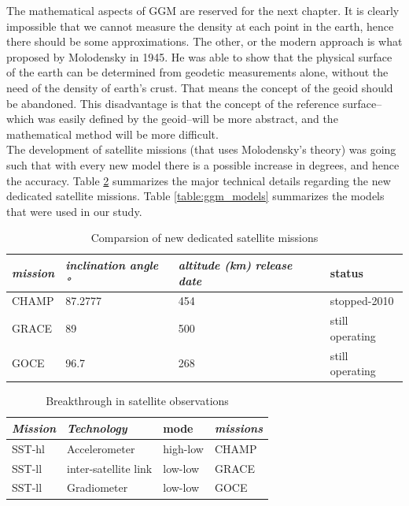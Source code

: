  The mathematical aspects of GGM are reserved for the next chapter. It is clearly impossible that we cannot measure the density at each point in the earth, hence there should be some approximations. The other, or the modern approach is what proposed by Molodensky in 1945. He was able to show that the physical surface of the earth can be determined from geodetic measurements alone, without the need of the density of earth's crust. That means the concept of the geoid should be abandoned. This disadvantage is that the concept of the reference surface--which was easily defined by the geoid--will be more abstract, and the mathematical method will be more difficult.
 \\
 The development of satellite missions (that uses Molodensky's theory) was going such that with every new model there is a possible increase in degrees, and hence the accuracy. Table \ref{table:satellite_evolution} summarizes the major technical details regarding the new dedicated satellite missions. Table \ref{table:ggm_models} summarizes the models that were used in our study. 
 
 \begin{table}[]
 	\centering
 	\caption{Comparsion of new dedicated satellite missions}
 	\label{table:satellite_missions}
 	\begin{tabular}{@{}llll@{}}
 		\toprule
 		\emph{mission} & \emph{inclination angle \si{\degree}} & \emph{altitude (km)} \emph{release date} & status\\ \midrule
 		
 		CHAMP & 87.2777 & 454 & stopped-2010 \\
 		GRACE & 89 & 500 & still operating\\
 		GOCE & 96.7 & 268& still operating\\ \bottomrule
 		
 	\end{tabular}
 \end{table}
 
 
 \begin{table}[]
 	\centering
 	\caption{Breakthrough in satellite observations}
 	\label{table:satellite_evolution}
 	\begin{tabular}{@{}llll@{}}
 		\toprule
 		\emph{Mission} & \emph{Technology}  & mode & \emph{missions}\\ \midrule
 		SST-hl & Accelerometer & high-low & CHAMP \\
 		SST-ll & inter-satellite link & low-low& GRACE\\
 		SST-ll & Gradiometer & low-low & GOCE\\\bottomrule
 		
 	\end{tabular}
 \end{table}
 
